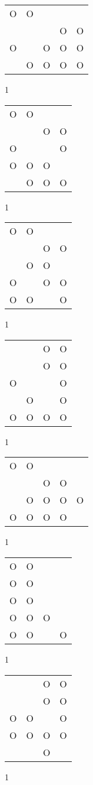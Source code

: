 \begin{tabular}{|m{0.2cm}m{0.2cm}m{0.2cm}m{0.2cm}m{0.2cm}|}\hline
O&O& & & \\
 & & &O&O\\
O& &O&O&O\\
 &O&O&O&O\\
\hline\end{tabular}1
\begin{tabular}{|m{0.2cm}m{0.2cm}m{0.2cm}m{0.2cm}|}\hline
O&O& & \\
 & &O&O\\
O& & &O\\
O&O&O& \\
 &O&O&O\\
\hline\end{tabular}1
\begin{tabular}{|m{0.2cm}m{0.2cm}m{0.2cm}m{0.2cm}|}\hline
O&O& & \\
 & &O&O\\
 &O&O& \\
O& &O&O\\
O&O& &O\\
\hline\end{tabular}1
\begin{tabular}{|m{0.2cm}m{0.2cm}m{0.2cm}m{0.2cm}|}\hline
 & &O&O\\
 & &O&O\\
O& & &O\\
 &O& &O\\
O&O&O&O\\
\hline\end{tabular}1
\begin{tabular}{|m{0.2cm}m{0.2cm}m{0.2cm}m{0.2cm}m{0.2cm}|}\hline
O&O& & & \\
 & &O&O& \\
 &O&O&O&O\\
O&O&O&O& \\
\hline\end{tabular}1
\begin{tabular}{|m{0.2cm}m{0.2cm}m{0.2cm}m{0.2cm}|}\hline
O&O& & \\
O&O& & \\
O&O& & \\
O&O&O& \\
O&O& &O\\
\hline\end{tabular}1
\begin{tabular}{|m{0.2cm}m{0.2cm}m{0.2cm}m{0.2cm}|}\hline
 & &O&O\\
 & &O&O\\
O&O& &O\\
O&O&O&O\\
 & &O& \\
\hline\end{tabular}1
